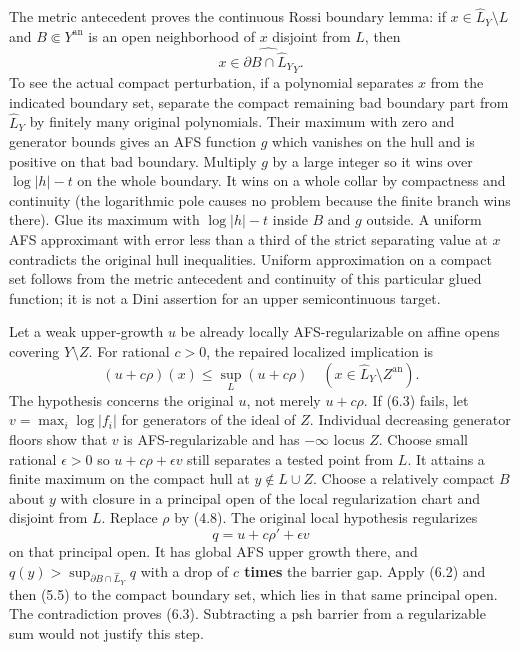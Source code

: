 \documentclass[
  10pt,
]{article}
\begin{document}
The metric antecedent proves the continuous Rossi boundary lemma: if
\(x\in\widehat L_Y\setminus L\) and \(B\Subset Y^{\mathrm{an}}\) is an
open neighborhood of \(x\) disjoint from \(L\), then
\[x\in\widehat{\partial B\cap\widehat L_Y}_Y. \tag{6.2}\] To see the
actual compact perturbation, if a polynomial separates \(x\) from the
indicated boundary set, separate the compact remaining bad boundary part
from \(\widehat L_Y\) by finitely many original polynomials. Their
maximum with zero and generator bounds gives an AFS function \(g\) which
vanishes on the hull and is positive on that bad boundary. Multiply
\(g\) by a large integer so it wins over \(\log|h|-t\) on the whole
boundary. It wins on a whole collar by compactness and continuity (the
logarithmic pole causes no problem because the finite branch wins
there). Glue its maximum with \(\log|h|-t\) inside \(B\) and \(g\)
outside. A uniform AFS approximant with error less than a third of the
strict separating value at \(x\) contradicts the original hull
inequalities. Uniform approximation on a compact set follows from the
metric antecedent and continuity of this particular glued function; it
is not a Dini assertion for an upper semicontinuous target.

Let a weak upper-growth \(u\) be already locally AFS-regularizable on
affine opens covering \(Y\setminus Z\). For rational \(c>0\), the
repaired localized implication is
\[ (u+c\rho)(x)\le\sup_L(u+c\rho)\quad(x\in\widehat L_Y\setminus Z^{\mathrm{an}}). \tag{6.3}\]
The hypothesis concerns the original \(u\), not merely \(u+c\rho\). If
(6.3) fails, let \(v=\max_i\log|f_i|\) for generators of the ideal of
\(Z\). Individual decreasing generator floors show that \(v\) is
AFS-regularizable and has \(-\infty\) locus \(Z\). Choose small rational
\(\epsilon>0\) so \(u+c\rho+\epsilon v\) still separates a tested point
from \(L\). It attains a finite maximum on the compact hull at
\(y\notin L\cup Z\). Choose a relatively compact \(B\) about \(y\) with
closure in a principal open of the local regularization chart and
disjoint from \(L\). Replace \(\rho\) by (4.8). The original local
hypothesis regularizes \[q=u+c\rho'+\epsilon v\] on that principal open.
It has global AFS upper growth there, and
\(q(y)>\sup_{\partial B\cap\widehat L_Y}q\) with a drop of \textbf{\(c\)
times} the barrier gap. Apply (6.2) and then (5.5) to the compact
boundary set, which lies in that same principal open. The contradiction
proves (6.3). Subtracting a psh barrier from a regularizable sum would
not justify this step.
\end{document}

